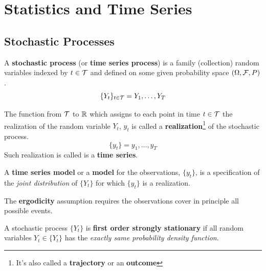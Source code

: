 \documentclass[11pt]{article}
\begin{document}
	\section{Statistics and Time Series}
		\subsection{Stochastic Processes}
		\begin{definition}
			A \textbf{stochastic process} (or \textbf{time series process}) is a family (collection) random variables indexed by $t \in \mathcal{{T}}$ and defined on some given probability space $(\Omega, \mathcal{{F}}, P)$.
			\begin{equation}
				\{Y_t\}_{t \in \mathcal{{T}}} = Y_1, \dots, Y_T
			\end{equation}
		\end{definition}
		
		\begin{definition}
			The function from $\mathcal{{T}}$ to $\mathbb{R}$ which assigns to each point in time $t \in \mathcal{{T}}$ the realization of the random variable $Y_t$, $y_t$ is called a \textbf{realization}\footnote{It's also called a \textbf{trajectory} or an \textbf{outcome}} of the stochastic process.
			\begin{equation}
				\{y_t\} = y_1, \dots, y_T
			\end{equation}
			Such realization is called is a \textbf{time series}.
		\end{definition}
		
		\begin{definition}
			A \textbf{time series model} or a \textbf{model} for the observations, $\{y_t\}$, is a specification of the \emph{joint distribution} of $\{Y_t\}$ for which $\{y_t\}$ is a realization.
		\end{definition}
		
		\begin{assumption}
			The \textbf{ergodicity} assumption requires the observations cover in principle all possible events.
		\end{assumption}
		
		\begin{definition}
			A stochastic process $\{Y_t\}$ is \textbf{first order strongly stationary} if all random variables $Y_t \in \{Y_t\}$ has the \emph{exactly same probability density function}.
		\end{definition}
		
		
\end{document}
